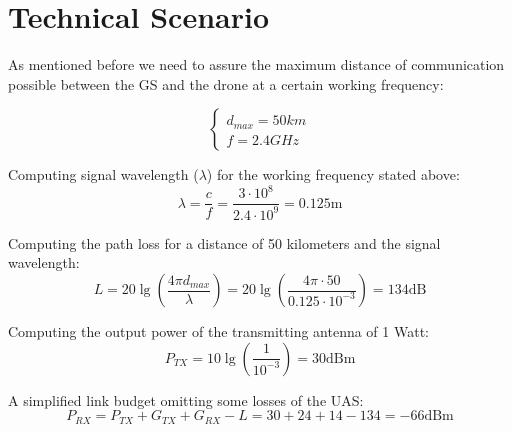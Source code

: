 \section{Technical Scenario}\label{sec:tech}

As mentioned before we need to assure the maximum distance of communication possible between the GS and the drone at a certain working frequency:

\begin{equation*}\label{eq:tech_parameters1} 
 	\begin{cases}
 		d_{max} = 50 km	\\
 		f = 2.4 GHz
 	\end{cases}
\end{equation*}

Computing signal wavelength ($\lambda$) for the working frequency stated above:
\begin{equation*}\label{eq:tech_parameters2}
	\lambda = \frac{c}{f} = \frac{3\cdot 10^{8}}{2.4\cdot 10^{9}} 
	        = 0.125 \text{m}
\end{equation*}

Computing the path loss for a distance of 50 kilometers and the signal wavelength:
\begin{equation*}\label{eq:tech_parameters3}
	L = 20\lg\left (\frac{4\pi d_{max}}{\lambda} \right)
	  = 20\lg\left (\frac{4\pi \cdot 50}{0.125\cdot 10^{-3}} \right)
	  = 134 \text{dB} 
\end{equation*}

Computing the output power of the transmitting antenna of 1 Watt:
\begin{equation*}\label{eq:tech_parameters4}
	P_{TX} = 10\lg\left (\frac{1}{10^{-3}} \right)  
	       = 30 \text{dBm}
\end{equation*}


A simplified link budget omitting some losses of the UAS:
\begin{equation*}\label{eq:tech_parameters5}
	P_{RX} = P_{TX} + G_{TX} + G_{RX} - L  
	       = 30 + 24 + 14 - 134 = -66 \text{dBm}
\end{equation*}
